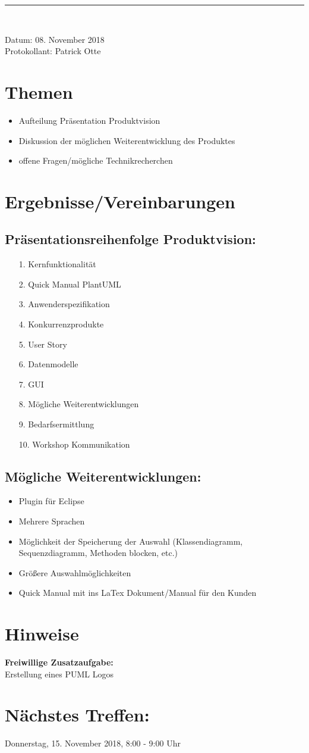 \begin{center}  
\vspace{15pt}\nointerlineskip\rule{\textwidth}{0.2pt}\\ 
\vspace{0.5pt}\nointerlineskip
\end{center}
\large Datum: 08. November 2018\vspace{3pt}\\\large Protokollant: Patrick Otte
\section{Themen}
\begin{itemize}
\item Aufteilung Präsentation Produktvision
\item Diskussion der möglichen Weiterentwicklung des Produktes
\item offene Fragen/mögliche Technikrecherchen
\end{itemize}
\section{Ergebnisse/Vereinbarungen}
\subsection*{Präsentationsreihenfolge Produktvision:}
\begin{itemize}
\item[1.] Kernfunktionalität
\item[2.] Quick Manual PlantUML
\item[3.] Anwenderspezifikation 
\item[4.] Konkurrenzprodukte
\item[5.] User Story
\item[6.] Datenmodelle
\item[7.] GUI
\item[8.] Mögliche Weiterentwicklungen
\item[9.] Bedarfsermittlung
\item[10.] Workshop Kommunikation
\end{itemize}
\subsection*{Mögliche Weiterentwicklungen:}
\begin{itemize}
\item Plugin für Eclipse
\item Mehrere Sprachen
\item Möglichkeit der Speicherung der Auswahl (Klassendiagramm, Sequenzdiagramm, Methoden
blocken, etc.)
\item Größere Auswahlmöglichkeiten
\item Quick Manual mit ins LaTex Dokument/Manual für den Kunden
\end{itemize}
\section{Hinweise}
\textbf{Freiwillige Zusatzaufgabe:} \\
Erstellung eines PUML Logos
\section*{Nächstes Treffen:}
Donnerstag, 15. November 2018, 8:00 - 9:00 Uhr